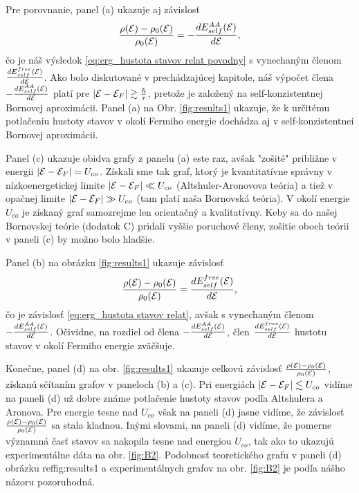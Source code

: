 Pre porovnanie, panel (a) ukazuje
aj závislosť 
\begin{equation}\label{eq:erg_hustota stavov relat naša bez}
\frac{\rho(\mathcal{E}) - \rho_0(\mathcal{E})}{\rho_0(\mathcal{E})} = - \frac{dE_{self}^{AA}(\mathcal{E})}{d\mathcal{E}} \text{,}
\end{equation}
čo je náš výsledok \eqref{eq:erg_hustota stavov relat povodny} s vynechaným členom $\frac{dE_{self}^{free}(\mathcal{E})}{d\mathcal{E}}$. 
Ako bolo diskutované v prechádzajúcej kapitole, náš výpočet člena  $- \frac{dE_{self}^{AA}(\mathcal{E})}{d\mathcal{E}}$ platí pre 
$|\mathcal{E}-\mathcal{E}_F| \gtrsim \frac{\hbar}{\tau}$, pretože je založený na self-konzistentnej Bornovej aproximácii. Panel (a)
na Obr. \ref{fig:results1} ukazuje, že k určitému potlačeniu hustoty stavov v okolí Fermiho energie dochádza aj v self-konzistentnei Bornovej aproximácii.
\vspace{2cm}

Panel (c) ukazuje obidva grafy z panelu (a) este raz, avšak "zošité" približne v energii  $|\mathcal{E}-\mathcal{E}_F| = U_{co}$. Získali sme tak graf, ktorý je
kvantitatívne správny v nízkoenergetickej limite $|\mathcal{E}-\mathcal{E}_F| \ll  U_{co}$ (Altshuler-Aronovova teória) a tiež v opačnej limite $|\mathcal{E}-\mathcal{E}_F| \gg U_{co}$ (tam platí naša Bornovská teória). 
V okolí energie $U_{co}$ je získaný graf samozrejme len orientačný a kvalitatívny. Keby sa do našej Bornovskej teórie (dodatok C) pridali vyššie poruchové členy, zošitie oboch teórii v 
paneli (c) by možno bolo hladšie.

Panel (b) na obrázku \ref{fig:results1} ukazuje závislosť 
\begin{equation}\label{eq:erg_hustota stavov relat prvy vynech}
\frac{\rho(\mathcal{E}) - \rho_0(\mathcal{E})}{\rho_0(\mathcal{E})} =  \frac{dE_{self}^{free}(\mathcal{E})}{d\mathcal{E}} \text{,}
\end{equation}
čo je závislosť \eqref{eq:erg_hustota stavov relat}, avšak s vynechaným členom $- \frac{dE_{self}^{AA}(\mathcal{E})}{d\mathcal{E}}$.
Očividne, na rozdiel od člena $- \frac{dE_{self}^{AA}(\mathcal{E})}{d\mathcal{E}}$, člen $\frac{dE_{self}^{free}(\mathcal{E})}{d\mathcal{E}}$ hustotu stavov v okolí Fermiho energie zväčšuje.

Konečne, panel (d) na obr.  \ref{fig:results1} ukazuje celkovú závislosť $\frac{\rho(\mathcal{E}) - \rho_0(\mathcal{E})}{\rho_0(\mathcal{E})}$, získanú sčítaním grafov v paneloch (b) a (c).
Pri energiách $|\mathcal{E}-\mathcal{E}_F| \lesssim U_{co}$ vidíme na paneli (d) už  dobre známe potlačenie hustoty stavov podľa Altshulera a Aronova. Pre energie tesne nad $U_{co}$ však 
na paneli (d) jasne vidíme, že závislosť $\frac{\rho(\mathcal{E}) - \rho_0(\mathcal{E})}{\rho_0(\mathcal{E})}$ sa stala kladnou. Inými slovami, na paneli (d) vidíme, že pomerne významná časť stavov sa nakopila tesne nad energiou
$U_{co}$, tak ako to ukazujú experimentálne dáta na obr. \eqref{fig:B2}. 
Podobnosť teoretického grafu v paneli (d) obrázku ref{fig:results1} a experimentálnych grafov na obr. \eqref{fig:B2} je podľa nášho názoru pozoruhodná.

